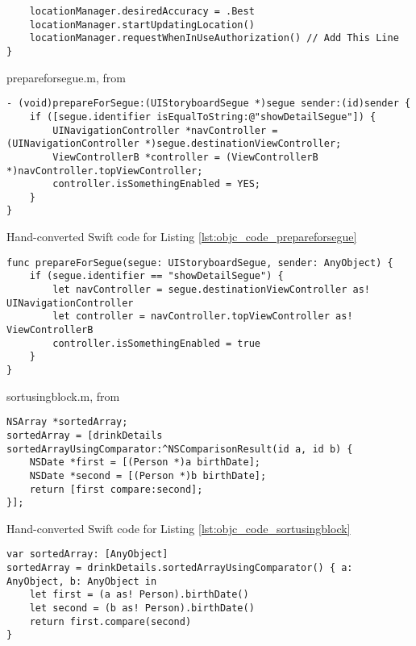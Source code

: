 \documentclass{sfuthesis}
\begin{document}
\begin{appendices}
\begin{listing}
\begin{verbatim}
    locationManager.desiredAccuracy = .Best
    locationManager.startUpdatingLocation()
    locationManager.requestWhenInUseAuthorization() // Add This Line
}
\end{verbatim}
\end{listing}

\begin{listing}
\caption{prepareforsegue.m, from \cite{so5210535}}
\label{lst:objc_code_prepareforsegue}
\begin{verbatim}
- (void)prepareForSegue:(UIStoryboardSegue *)segue sender:(id)sender {
    if ([segue.identifier isEqualToString:@"showDetailSegue"]) {
        UINavigationController *navController = (UINavigationController *)segue.destinationViewController;
        ViewControllerB *controller = (ViewControllerB *)navController.topViewController;
        controller.isSomethingEnabled = YES;
    }
}
\end{verbatim}
\end{listing}

\begin{listing}
\caption{Hand-converted Swift code for Listing \ref{lst:objc_code_prepareforsegue}}
\begin{verbatim}
func prepareForSegue(segue: UIStoryboardSegue, sender: AnyObject) {
    if (segue.identifier == "showDetailSegue") {
        let navController = segue.destinationViewController as! UINavigationController
        let controller = navController.topViewController as! ViewControllerB
        controller.isSomethingEnabled = true
    }
}
\end{verbatim}
\end{listing}

\begin{listing}
\caption{sortusingblock.m, from \cite{so805547}}
\label{lst:objc_code_sortusingblock}
\begin{verbatim}
NSArray *sortedArray;
sortedArray = [drinkDetails sortedArrayUsingComparator:^NSComparisonResult(id a, id b) {
    NSDate *first = [(Person *)a birthDate];
    NSDate *second = [(Person *)b birthDate];
    return [first compare:second];
}];
\end{verbatim}
\end{listing}

\begin{listing}
\caption{Hand-converted Swift code for Listing \ref{lst:objc_code_sortusingblock}}
\begin{verbatim}
var sortedArray: [AnyObject]
sortedArray = drinkDetails.sortedArrayUsingComparator() { a: AnyObject, b: AnyObject in
    let first = (a as! Person).birthDate()
    let second = (b as! Person).birthDate()
    return first.compare(second)
}
\end{verbatim}
\end{listing}


\end{appendices}
\end{document}
